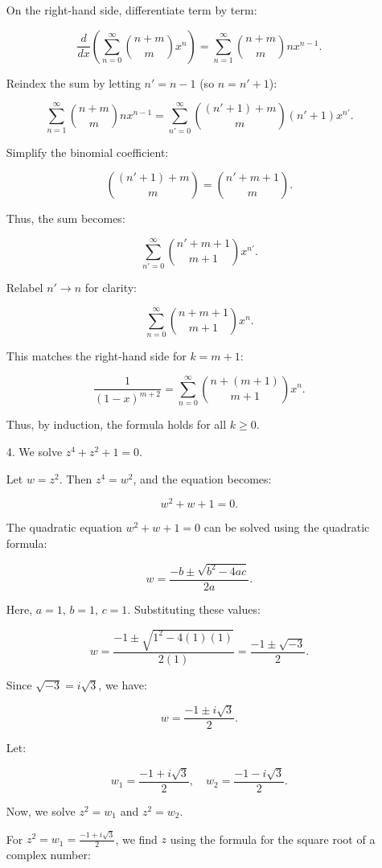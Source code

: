 \documentclass[12pt]{article}
\begin{document}
\begin{enumerate}
On the right-hand side, differentiate term by term:

\[
\frac{d}{dx} \left( \sum_{n=0}^\infty \binom{n+m}{m} x^n \right) = \sum_{n=1}^\infty \binom{n+m}{m} n x^{n-1}.
\]

Reindex the sum by letting \( n' = n-1 \) (so \( n = n'+1 \)):

\[
\sum_{n=1}^\infty \binom{n+m}{m} n x^{n-1} = \sum_{n'=0}^\infty \binom{(n'+1)+m}{m} (n'+1) x^{n'}.
\]

Simplify the binomial coefficient:

\[
\binom{(n'+1)+m}{m} = \binom{n'+m+1}{m}.
\]

Thus, the sum becomes:

\[
\sum_{n'=0}^\infty \binom{n'+m+1}{m+1} x^{n'}.
\]

Relabel \( n' \to n \) for clarity:

\[
\sum_{n=0}^\infty \binom{n+m+1}{m+1} x^n.
\]

This matches the right-hand side for \( k = m+1 \):

\[
\frac{1}{(1-x)^{m+2}} = \sum_{n=0}^\infty \binom{n+(m+1)}{m+1} x^n.
\]

Thus, by induction, the formula holds for all \( k \geq 0 \).

\item [4. ]
We solve \( z^4 + z^2 + 1 = 0 \).

Let \( w = z^2 \). Then \( z^4 = w^2 \), and the equation becomes:

\[
w^2 + w + 1 = 0.
\]

The quadratic equation \( w^2 + w + 1 = 0 \) can be solved using the quadratic formula:

\[
w = \frac{-b \pm \sqrt{b^2 - 4ac}}{2a}.
\]

Here, \( a = 1 \), \( b = 1 \), \( c = 1 \). Substituting these values:

\[
w = \frac{-1 \pm \sqrt{1^2 - 4(1)(1)}}{2(1)} = \frac{-1 \pm \sqrt{-3}}{2}.
\]

Since \( \sqrt{-3} = i\sqrt{3} \), we have:

\[
w = \frac{-1 \pm i\sqrt{3}}{2}.
\]

Let:

\[
w_1 = \frac{-1 + i\sqrt{3}}{2}, \quad w_2 = \frac{-1 - i\sqrt{3}}{2}.
\]

Now, we solve \( z^2 = w_1 \) and \( z^2 = w_2 \).

For \( z^2 = w_1 = \frac{-1 + i\sqrt{3}}{2} \), we find \( z \) using the formula for the square root of a complex number:


\end{enumerate}
\end{document}
